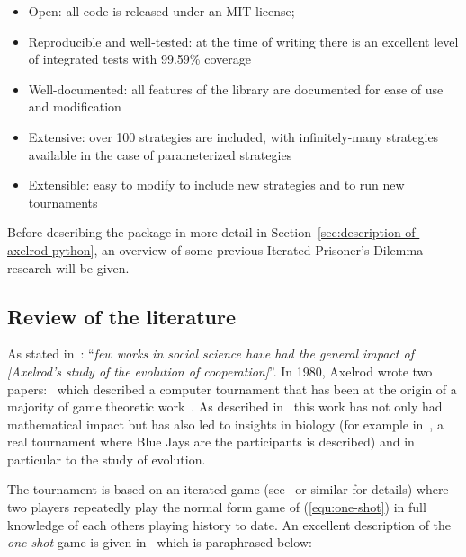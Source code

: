 \documentclass{article}
\begin{document}
\begin{itemize}
    \item Open: all code is released under an MIT license;
    \item Reproducible and well-tested: at the time of writing there is an excellent level of
        integrated tests with 99.59\% coverage
    \item Well-documented: all features of the library are documented for ease of
        use and modification
    \item Extensive: over 100 strategies are included, with infinitely-many
    strategies available in the case of parameterized strategies
    \item Extensible: easy to modify to include new strategies and to run new tournaments
\end{itemize}

Before describing the package in more detail in
Section~\ref{sec:description-of-axelrod-python}, an overview of some previous
Iterated Prisoner's Dilemma research will be given.

\subsection{Review of the literature}\label{sec:review}

As stated in~\cite{Bendor1991}: ``\textit{few works in social science have had
the general impact of [Axelrod's study of the evolution of cooperation]}''.  In
1980, Axelrod wrote two papers:~\cite{Axelrod1980a,Axelrod1980b} which
described a computer tournament that has been at the origin of a majority of
game theoretic work~\cite{Banks1990, Bendor1991, Boyd1987, Chellapilla1999,
DavidB1993, Doebeli2005, Ellison1994, Gotts2003, Hilbe2013, Isaac2008,
Kraines1989, Lee2015, Lorberbaum1994, Milgrom1982, Molander1985, Murnighan2015,
Press2012, Stephens2002, Stewart2012}. As described in~\cite{Bendor1991} this
work has not only had mathematical impact but has also led to insights in
biology (for example in~\cite{Stephens2002}, a real tournament where Blue Jays
are the participants is described) and in particular to the study of evolution.

The tournament is based on an iterated game (see~\cite{Maschler2013} or similar
for details) where two players repeatedly play the normal form game of
(\ref{equ:one-shot}) in full knowledge of each others playing history to date.
An excellent description of the \textit{one shot} game is given
in~\cite{Gotts2003} which is paraphrased below:
\end{document}
